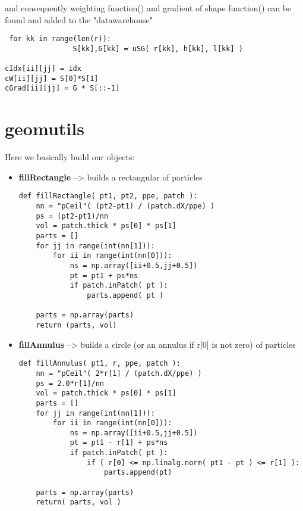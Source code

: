 \documentclass[11pt,fleqn]{book} %
\begin{document}
and consequently weighting function() and gradient of shape function() can be found and added to the "datawarehouse"

\begin{lstlisting}
 for kk in range(len(r)):
                S[kk],G[kk] = uSG( r[kk], h[kk], l[kk] )

cIdx[ii][jj] = idx
cW[ii][jj] = S[0]*S[1]
cGrad[ii][jj] = G * S[::-1] 
\end{lstlisting}







\chapter{geomutils}
\label{chap:geomutils}
Here we basically build our objects:
\begin{itemize}
\item  \textbf{fillRectangle} --> builds a rectangular of particles
\begin{lstlisting}
def fillRectangle( pt1, pt2, ppe, patch ):
    nn = "pCeil"( (pt2-pt1) / (patch.dX/ppe) )
    ps = (pt2-pt1)/nn
    vol = patch.thick * ps[0] * ps[1]
    parts = []
    for jj in range(int(nn[1])):
        for ii in range(int(nn[0])):
            ns = np.array([ii+0.5,jj+0.5])
            pt = pt1 + ps*ns
            if patch.inPatch( pt ):
                parts.append( pt )
                
    parts = np.array(parts)
    return (parts, vol)
\end{lstlisting}
\item  \textbf{fillAnnulus} --> builds a circle (or an annulus if r[0] is not zero) of particles
\begin{lstlisting}
def fillAnnulus( pt1, r, ppe, patch ):
    nn = "pCeil"( 2*r[1] / (patch.dX/ppe) )
    ps = 2.0*r[1]/nn
    vol = patch.thick * ps[0] * ps[1]
    parts = []
    for jj in range(int(nn[1])):
        for ii in range(int(nn[0])):
            ns = np.array([ii+0.5,jj+0.5])
            pt = pt1 - r[1] + ps*ns
            if patch.inPatch( pt ):
                if ( r[0] <= np.linalg.norm( pt1 - pt ) <= r[1] ):
                    parts.append(pt)

    parts = np.array(parts)
    return( parts, vol )
\end{lstlisting}
\end{itemize}
\end{document}
